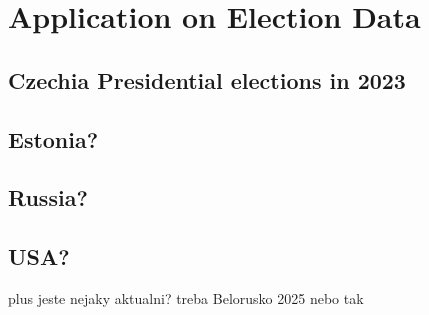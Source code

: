 \chapter{Application on Election Data} %




\section{Czechia Presidential elections in 2023}




\section{Estonia?}

\section{Russia?}

\section{USA?}

\begin{koment}
plus jeste nejaky aktualni? treba Belorusko 2025 nebo tak 
\end{koment}
    




